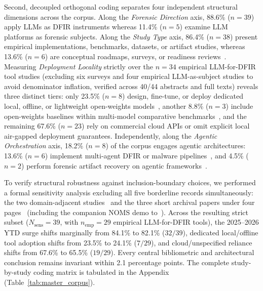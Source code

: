 

Second, decoupled orthogonal coding separates four independent structural dimensions across the corpus. Along the \textit{Forensic Direction} axis, 88.6\% ($n=39$) apply LLMs as DFIR instruments whereas 11.4\% ($n=5$) examine LLM platforms as forensic subjects. Along the \textit{Study Type} axis, 86.4\% ($n=38$) present empirical implementations, benchmarks, datasets, or artifact studies, whereas 13.6\% ($n=6$) are conceptual roadmaps, surveys, or readiness reviews~\cite{scanlon2023_digital, scanlon2023_chatgpt, wickramasekara2025_exploring, chernyshev2026_large, jelodar2026_large, scanlon2026_investigation}. Measuring \textit{Deployment Locality} strictly over the $n=34$ empirical LLM-for-DFIR tool studies (excluding six surveys and four empirical LLM-as-subject studies to avoid denominator inflation, verified across 40/44 abstracts and full texts) reveals three distinct tiers: only 23.5\% ($n=8$) design, fine-tune, or deploy dedicated local, offline, or lightweight open-weights models~\cite{sharma2025_forensicllm, michelet2024_chatgpt, michelet2025_finetuning, tiwari2026_xforensicnet, kao2026_a, hammar2026_incident, hammar2026_a, clark2025_large}, another 8.8\% ($n=3$) include open-weights baselines within multi-model comparative benchmarks~\cite{chakir2025_forensicsdata, studiawan2025_towards, sava2026_triagecpg}, and the remaining 67.6\% ($n=23$) rely on commercial cloud APIs or omit explicit local air-gapped deployment guarantees. Independently, along the \textit{Agentic Orchestration} axis, 18.2\% ($n=8$) of the corpus engages agentic architectures: 13.6\% ($n=6$) implement multi-agent DFIR or malware pipelines~\cite{liu2025_autobnb, ozyurt2026_llmorchestrated, zgzler2026_eventdriven, tian2026_gala, zheng2025_avagent, tiwari2026_xforensicnet}, and 4.5\% ($n=2$) perform forensic artifact recovery on agentic frameworks~\cite{walker2024_forensic, satter2026_with}.

To verify structural robustness against inclusion-boundary choices, we performed a formal sensitivity analysis excluding all five borderline records simultaneously: the two domain-adjacent studies~\cite{farber2025_scpaiscp, tian2026_gala} and the three short archival papers under four pages~\cite{xu2025_enhancing, sudheer2026_least, hammar2026_a} (including the companion NOMS demo to~\cite{hammar2026_incident}). Across the resulting strict subset ($N_{\text{sens}}=39$, with $n_{\text{emp}}=29$ empirical LLM-for-DFIR tools), the 2025--2026 YTD surge shifts marginally from 84.1\% to 82.1\% ($32/39$), dedicated local/offline tool adoption shifts from 23.5\% to 24.1\% ($7/29$), and cloud/unspecified reliance shifts from 67.6\% to 65.5\% ($19/29$). Every central bibliometric and architectural conclusion remains invariant within 2.1 percentage points. The complete study-by-study coding matrix is tabulated in the Appendix (Table~\ref{tab:master_corpus}).

